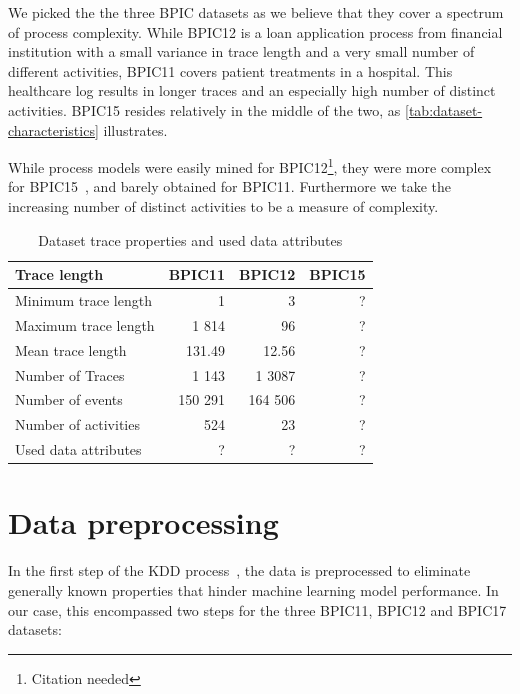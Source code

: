 We picked the the three BPIC datasets as we believe that they cover a spectrum of process complexity. While BPIC12 is a loan application process from financial institution with a small variance in trace length and a very small number of different activities, BPIC11 covers patient treatments in a hospital. This healthcare log results in longer traces and an especially high number of distinct activities.
BPIC15 resides relatively in the middle of the two, as \autoref{tab:dataset-characteristics} illustrates.

While process models were easily mined for BPIC12\footnote{Citation needed}, they were more complex for BPIC15~\cite{van2015benchmarking}, and barely obtained for BPIC11. Furthermore we take the increasing number of distinct activities to be a measure of complexity.


\begin{table}[]
    \centering
    \begin{tabular}{l|rrr}
    \textbf{Trace length} & \textbf{BPIC11} & \textbf{BPIC12} &  \textbf{BPIC15} \\
    \hline
    Minimum trace length & 1 & 3 & ?\\
    Maximum trace length & 1 814 & 96 & ?\\
    Mean trace length & 131.49 & 12.56 & ?\\
    Number of Traces & 1 143 & 1 3087 & ?\\
    Number of events & 150 291 & 164 506 & ?\\
    Number of activities & 524 & 23 & ?\\
    Used data attributes & ? & ? & ?\\
    \end{tabular}
    \caption{Dataset trace properties and used data attributes}
    \label{tab:dataset-characteristics}
\end{table}

\section{Data preprocessing}
\label{sec:eval:data-preprocessing}
In the first step of the KDD process~\cite{fayyad1996data}, the data is preprocessed to eliminate generally known properties that hinder machine learning model performance. In our case, this encompassed two steps for the three BPIC11, BPIC12 and BPIC17 datasets:

